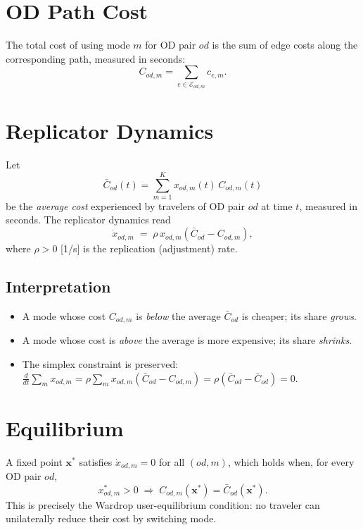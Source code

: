 \documentclass[11pt,a4paper]{article}
\begin{document}
\section{OD Path Cost}

The total cost of using mode $m$ for OD pair $od$ is the sum of edge costs along the corresponding path, measured in seconds:
\[
  C_{od,m} = \sum_{e \in \mathcal{E}_{od,m}} c_{e,m}.
\]

\section{Replicator Dynamics}

Let
\[
  \bar{C}_{od}(t) = \sum_{m=1}^{K} x_{od,m}(t)\, C_{od,m}(t)
\]
be the \emph{average cost} experienced by travelers of OD pair $od$ at time $t$, measured in seconds. The replicator dynamics read
\[
  \boxed{
  \dot{x}_{od,m} \;=\; \rho\, x_{od,m}\!\left(\bar{C}_{od} - C_{od,m}\right),
  }
\]
where $\rho > 0$ [1/s] is the replication (adjustment) rate.

\subsection*{Interpretation}
\begin{itemize}
  \item A mode whose cost $C_{od,m}$ is \emph{below} the average $\bar{C}_{od}$ is cheaper; its share \emph{grows}.
  \item A mode whose cost is \emph{above} the average is more expensive; its share \emph{shrinks}.
  \item The simplex constraint is preserved: $\tfrac{d}{dt}\sum_m x_{od,m} = \rho\sum_m x_{od,m}(\bar C_{od} - C_{od,m}) = \rho(\bar C_{od} - \bar C_{od}) = 0$.
\end{itemize}

\section{Equilibrium}

A fixed point $\mathbf{x}^*$ satisfies $\dot{x}_{od,m}=0$ for all $(od,m)$, which holds when, for every OD pair $od$,
\[
  x^*_{od,m} > 0 \;\Longrightarrow\; C_{od,m}(\mathbf{x}^*) = \bar{C}_{od}(\mathbf{x}^*).
\]
This is precisely the Wardrop user-equilibrium condition: no traveler can unilaterally reduce their cost by switching mode.
\end{document}
